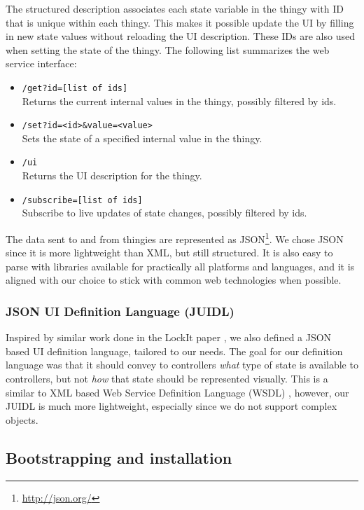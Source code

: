 \documentclass{ubicomp2012}
\begin{document}
The structured description associates each state variable in the thingy with ID that is unique within each thingy. This makes it possible update the UI by filling in new state values without reloading the UI description. These IDs are also used when setting the state of the thingy. The following list summarizes the web service interface:

\begin{itemize}
\item \lstinline{/get?id=[list of ids]}\\
Returns the current internal values in the thingy, possibly filtered by ids.
\item \lstinline{/set?id=<id>&value=<value>}\\
Sets the state of a specified internal value in the thingy.
\item \lstinline{/ui}\\
Returns the UI description for the thingy.
\item \lstinline{/subscribe=[list of ids]}\\
Subscribe to live updates of state changes, possibly filtered by ids.
\end{itemize}

The data sent to and from thingies are represented as JSON\footnote{\url{http://json.org/}}. We chose JSON since it is more lightweight than XML, but still structured. It is also easy to parse with libraries available for practically all platforms and languages, and it is aligned with our choice to stick with common web technologies when possible.

\subsubsection{JSON UI Definition Language (JUIDL)}

Inspired by similar work done in the LockIt paper \cite{lockit}, we also defined a JSON based UI definition language, tailored to our needs. The goal for our definition language was that it should convey to controllers \emph{what} type of state is available to controllers, but not \emph{how} that state should be represented visually. This is a similar to XML based Web Service Definition Language (WSDL) \cite{Christensen2001}, however, our JUIDL is much more lightweight, especially since we do not support complex objects.

\subsection{Bootstrapping and installation}
\end{document}
